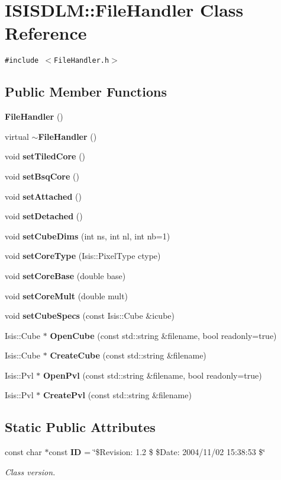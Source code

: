 \section{ISISDLM::File\-Handler Class Reference}
\label{classISISDLM_1_1FileHandler}
{\tt \#include $<$File\-Handler.h$>$}

\subsection*{Public Member Functions}
\begin{CompactItemize}
\item 
{\bf File\-Handler} ()
\item 
virtual {\bf $\sim$File\-Handler} ()
\item 
void {\bf set\-Tiled\-Core} ()
\item 
void {\bf set\-Bsq\-Core} ()
\item 
void {\bf set\-Attached} ()
\item 
void {\bf set\-Detached} ()
\item 
void {\bf set\-Cube\-Dims} (int ns, int nl, int nb=1)
\item 
void {\bf set\-Core\-Type} (Isis::Pixel\-Type ctype)
\item 
void {\bf set\-Core\-Base} (double base)
\item 
void {\bf set\-Core\-Mult} (double mult)
\item 
void {\bf set\-Cube\-Specs} (const Isis::Cube \&icube)
\item 
Isis::Cube $\ast$ {\bf Open\-Cube} (const std::string \&filename, bool readonly=true)
\item 
Isis::Cube $\ast$ {\bf Create\-Cube} (const std::string \&filename)
\item 
Isis::Pvl $\ast$ {\bf Open\-Pvl} (const std::string \&filename, bool readonly=true)
\item 
Isis::Pvl $\ast$ {\bf Create\-Pvl} (const std::string \&filename)
\end{CompactItemize}
\subsection*{Static Public Attributes}
\begin{CompactItemize}
\item 
const char $\ast$const {\bf ID} = \char`\"{}\$Revision: 1.2 \$ \$Date: 2004/11/02 15:38:53 \$\char`\"{}
\begin{CompactList}\small\item\em Class version. \item\end{CompactList}\end{CompactItemize}
